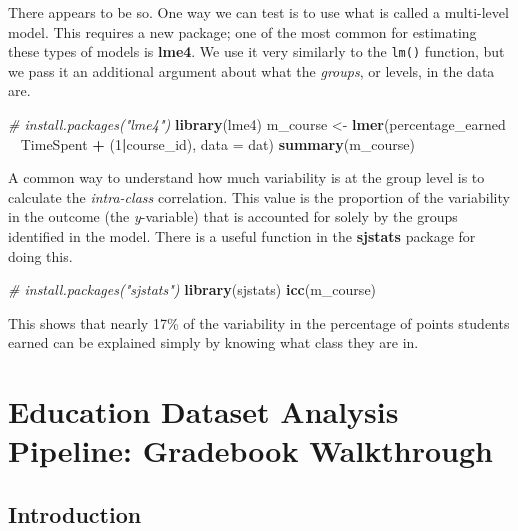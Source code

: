 \documentclass[]{book}
\newenvironment{Shaded}{\begin{snugshade}}{\end{snugshade}}
\newcommand{\KeywordTok}[1]{\textcolor[rgb]{0.13,0.29,0.53}{\textbf{#1}}}
\newcommand{\DataTypeTok}[1]{\textcolor[rgb]{0.13,0.29,0.53}{#1}}
\newcommand{\DecValTok}[1]{\textcolor[rgb]{0.00,0.00,0.81}{#1}}
\newcommand{\StringTok}[1]{\textcolor[rgb]{0.31,0.60,0.02}{#1}}
\newcommand{\CommentTok}[1]{\textcolor[rgb]{0.56,0.35,0.01}{\textit{#1}}}
\newcommand{\OperatorTok}[1]{\textcolor[rgb]{0.81,0.36,0.00}{\textbf{#1}}}
\newcommand{\NormalTok}[1]{#1}
\begin{document}
There appears to be so. One way we can test is to use what is called a
multi-level model. This requires a new package; one of the most common
for estimating these types of models is \textbf{lme4}. We use it very
similarly to the \texttt{lm()} function, but we pass it an additional
argument about what the \emph{groups}, or levels, in the data are.

\begin{Shaded}
\begin{Highlighting}[]
\CommentTok{# install.packages("lme4")}
\KeywordTok{library}\NormalTok{(lme4)}
\NormalTok{m_course <-}\StringTok{ }\KeywordTok{lmer}\NormalTok{(percentage_earned }\OperatorTok{~}\StringTok{ }\NormalTok{TimeSpent }\OperatorTok{+}\StringTok{ }\NormalTok{(}\DecValTok{1}\OperatorTok{|}\NormalTok{course_id), }\DataTypeTok{data =}\NormalTok{ dat)}
\KeywordTok{summary}\NormalTok{(m_course)}
\end{Highlighting}
\end{Shaded}

A common way to understand how much variability is at the group level is
to calculate the \emph{intra-class} correlation. This value is the
proportion of the variability in the outcome (the \emph{y}-variable)
that is accounted for solely by the groups identified in the model.
There is a useful function in the \textbf{sjstats} package for doing
this.

\begin{Shaded}
\begin{Highlighting}[]
\CommentTok{# install.packages("sjstats")}
\KeywordTok{library}\NormalTok{(sjstats)}
\KeywordTok{icc}\NormalTok{(m_course)}
\end{Highlighting}
\end{Shaded}

This shows that nearly 17\% of the variability in the percentage of
points students earned can be explained simply by knowing what class
they are in.

\chapter{Education Dataset Analysis Pipeline: Gradebook
Walkthrough}\label{education-dataset-analysis-pipeline-gradebook-walkthrough}

\section{Introduction}\label{introduction-1}
\end{document}
